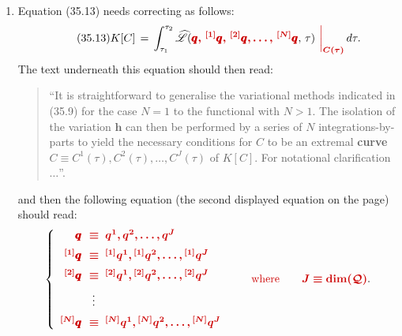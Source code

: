 \documentclass[12pt]{GeomPhysBOOK}
\newcommand\correct[1]{{\color{red!80!black}\bf #1}}
\newcommand\mcorrect[1]{{\color{red!80!black}\bm{#1}}}
\newcommand\listrule{\vspace{0.2cm}\hrule height 0.3pt}
\begin{document}
\begin{enumerate}[leftmargin=1.9cm,labelwidth=1.4cm,itemsep=0.5cm]
\begin{align}
			\begin{split}
				I[C+\pmb{h}] - I[C] &\,=\, \int_{t_{1}}^{t_{2}}\left\{ \wh{\mathscr{L}}(\qq+\pmb{h},\,\dot{\qq}+\dot{\pmb{h}},\, t) - \wh{\mathscr{L}}(\qq,\,\dot{\qq},\, t) \right\}\mcorrect{\left.\df\right|_{C(t)}}\,dt \\[0.2cm]
					&\,=\, \int_{t_{1}}^{t_{2}}\left\{ \frac{\partial\wh{\mathscr{L}}}{\partial \qq}\,\pmb{h} +  \frac{\partial\wh{\mathscr{L}}}{\partial \dot{\qq}}\,\dot{\pmb{h}} \right\}\mcorrect{\left.\df\right|_{C(t)}}\,dt + O\!\left(\norm{\pmb{h}}^{2}\right).
			\end{split} 
		\end{align}
	\newpage
	\listrule
	\item[\underline{page 690}:]
		Equation (35.13) needs correcting as follows:
		\begin{align}\tag{35.13}
			K[C] \,=\, \int_{\tau_{1}}^{\tau_{2}}\wh{\mathscr{L}}(\mcorrect{\qq,\,{}^{[1]}\qq,\,{}^{[2]}\qq,\ldots,\,{}^{[N]}\qq},\, \tau)\mcorrect{\left.\df\right|_{C(\tau)}} \,d\tau.
		\end{align}
		The text underneath this equation should then read:
		\begin{quote}
			``It is straightforward to generalise the variational methods indicated in (35.9) for the case $N=1$ to the functional with $N>1$. The isolation of the variation $\pmb{h}$ can then be performed by a series of $N$ integrations-by-parts to yield the necessary conditions for $C$ to be an extremal \correct{curve $C\equiv C^{1}(\tau),C^{2}(\tau),\ldots,C^{J}(\tau)$} of $K[C]$. For notational clarification $\ldots$''.
		\end{quote}
		and then the following equation (the second displayed equation on the page) should read:		
		\begin{align*}
			\left\{	\begin{array}{rl}
						\mcorrect{\qq} &\mcorrect{\!\!\equiv\; q^{1},q^{2},\ldots,q^{J}} \\[0.2cm]
						\mcorrect{{}^{[1]}\qq} 	&\mcorrect{\!\!\equiv\; {}^{[1]}q^{1}, {}^{[1]}q^{2}, \ldots, {}^{[1]}q^{J}} \\[0.2cm]
						\mcorrect{{}^{[2]}\qq} 	&\mcorrect{\!\!\equiv\; {}^{[2]}q^{1}, {}^{[2]}q^{2}, \ldots, {}^{[2]}q^{J}} \\[0.2cm]
									&\;\!\!\vdots \\[0.2cm]
						\mcorrect{{}^{[N]}\qq} 	&\mcorrect{\!\!\equiv\; {}^{[N]}q^{1}, {}^{[N]}q^{2}, \ldots, {}^{[N]}q^{J}}
					\end{array}\right. \qquad\mcorrect{\text{where}\qquad J\equiv \dim(\mathcal{Q})}.

\end{align*}
\end{enumerate}
\end{document}
